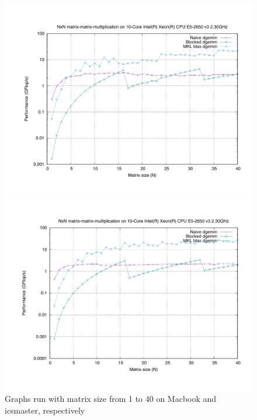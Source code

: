 \documentclass[unicode,11pt,a4paper,oneside,numbers=endperiod,openany]{scrartcl}
\begin{document}
\begin{enumerate}
            \begin{figure}[H]
                \begin{minipage}{.5\textwidth}
                    \centering
                    \includegraphics[width=\linewidth]{./results/0to40_mac}
                \end{minipage}%
                \hfill
                \begin{minipage}{.5\textwidth}
                    \centering
                    \includegraphics[width=\linewidth]{./results/0to40_icsmaster}
                \end{minipage}
                \caption{Graphs run with matrix size from 1 to 40 on Macbook and icsmaster, respectively}
                \label{c512}
            \end{figure}


\end{enumerate}
\end{document}

